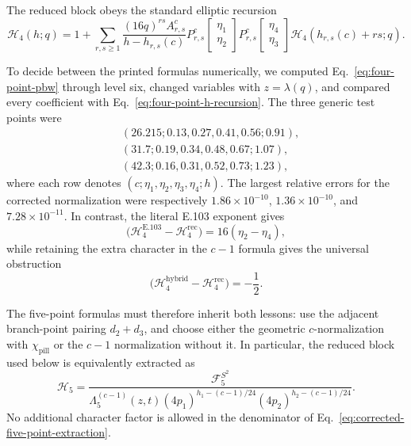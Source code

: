 \documentclass[11pt]{article}
\newcommand{\cF}{\mathcal F}
\newcommand{\cH}{\mathcal H}
\begin{document}
The reduced block obeys the standard elliptic recursion
\begin{equation}
\boxed{
 \cH_4(h;q)
 =1+\sum_{r,s\geq1}
 \frac{(16q)^{rs}A_{r,s}^{c}}
      {h-h_{r,s}(c)}
 P_{r,s}^{c}\!\begin{bmatrix}\eta_1\\\eta_2\end{bmatrix}
 P_{r,s}^{c}\!\begin{bmatrix}\eta_4\\\eta_3\end{bmatrix}
 \cH_4\!\left(h_{r,s}(c)+rs;q\right).}
 \label{eq:four-point-h-recursion}
\end{equation}

To decide between the printed formulas numerically, we computed
Eq.~\eqref{eq:four-point-pbw} through level six, changed variables with
$z=\lambda(q)$, and compared every coefficient with
Eq.~\eqref{eq:four-point-h-recursion}.  The three generic test points were
\begin{align*}
 &(26.215;0.13,0.27,0.41,0.56;0.91),\\
 &(31.7;0.19,0.34,0.48,0.67;1.07),\\
 &(42.3;0.16,0.31,0.52,0.73;1.23),
\end{align*}
where each row denotes $(c;\eta_1,\eta_2,\eta_3,\eta_4;h)$.  The largest
relative errors for the corrected normalization were respectively
$1.86\times10^{-10}$, $1.36\times10^{-10}$, and
$7.28\times10^{-11}$.  In contrast, the literal E.103 exponent gives
\begin{equation}
 [q]\bigl(\cH_4^{\mathrm{E.103}}-\cH_4^{\mathrm{rec}}\bigr)
 =16(\eta_2-\eta_4),
 \label{eq:four-point-e103-obstruction}
\end{equation}
while retaining the extra character in the $c-1$ formula gives the
universal obstruction
\begin{equation}
 [q^2]\bigl(\cH_4^{\mathrm{hybrid}}-\cH_4^{\mathrm{rec}}\bigr)
 =-\frac12.
 \label{eq:four-point-character-obstruction}
\end{equation}

The five-point formulas must therefore inherit both lessons: use the
adjacent branch-point pairing $d_2+d_3$, and choose either the geometric
$c$-normalization with $\chi_{\mathrm{pill}}$ or the $c-1$ normalization
without it.  In particular, the reduced block used below is equivalently
extracted as
\begin{equation}
 \boxed{
 \cH_5
 =\frac{\cF^{S^2}_5}
 {\Lambda_5^{(c-1)}(z,t)
  (4p_1)^{h_1-(c-1)/24}(4p_2)^{h_2-(c-1)/24}}.}
 \label{eq:corrected-five-point-extraction}
\end{equation}
No additional character factor is allowed in the denominator of
Eq.~\eqref{eq:corrected-five-point-extraction}.
\end{document}
